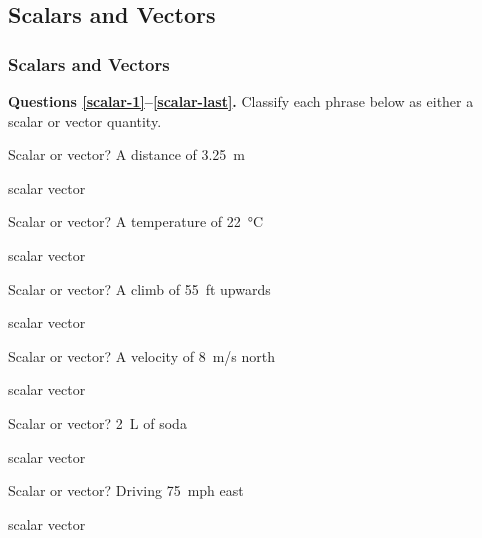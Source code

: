 \documentclass[]{exam}
\begin{document}
\subsection{Scalars and Vectors}

\subsubsection{Scalars and Vectors}

\textbf{Questions \ref{scalar-1}--\ref{scalar-last}.} Classify each phrase below as either a scalar or vector quantity.

\begin{questions}

\question \label{scalar-1}
Scalar or vector? A distance of \SI{3.25}{m}

\begin{randomizechoices}[norandomize]
    \correctchoice scalar
    \choice vector
\end{randomizechoices}


\question
Scalar or vector? A temperature of \SI{22}{\degreeCelsius}

\begin{randomizechoices}[norandomize]
    \correctchoice scalar
    \choice vector
\end{randomizechoices}


\question
Scalar or vector? A climb of \SI{55}{ft} upwards

\begin{randomizechoices}[norandomize]
    \choice scalar
    \correctchoice vector
\end{randomizechoices}


\question
Scalar or vector? A velocity of \SI{8}{m/s} north

\begin{randomizechoices}[norandomize]
    \choice scalar
    \correctchoice vector
\end{randomizechoices}


\question
Scalar or vector? \SI{2}{L} of soda

\begin{randomizechoices}[norandomize]
    \correctchoice scalar
    \choice vector
\end{randomizechoices}


\question
Scalar or vector? Driving \SI{75}{mph} east

\begin{randomizechoices}[norandomize]
    \choice scalar
    \correctchoice vector
\end{randomizechoices}



\end{questions}
\end{document}
